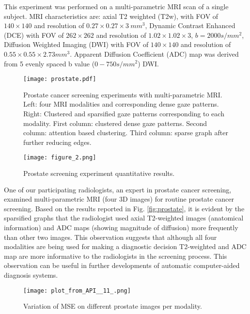 \documentclass[preprint,12pt]{elsarticle}
\begin{document}
This experiment was performed on a multi-parametric MRI scan of a single subject. MRI characteristics are: axial T2 weighted (T2w), with FOV of $140\times 140$ and resolution of $0.27\times 0.27\times 3~mm^{3}$, Dynamic Contrast Enhanced (DCE) with FOV of $262\times 262$ and resolution of $1.02\times 1.02\times 3$, $b=2000s/mm^{2}$, Diffusion Weighted Imaging (DWI) with FOV of $140\times 140$ and resolution of $0.55\times 0.55\times 2.73 mm^{3}$. Apparent Diffusion Coefficient (ADC) map was derived from 5 evenly spaced b value ($0-750s/mm^{2}$) DWI.


\begin{figure*}
\centering
\texttt{[image: prostate.pdf]}
\caption{Prostate cancer screening experiments with multi-parametric MRI. Left: four MRI modalities and corresponding dense gaze patterns. Right: Clustered and sparsified gaze patterns corresponding to each modality. First column: clustered dense gaze patterns. Second column: attention based clustering. Third column: sparse graph after further reducing edges. \label{fig:prostate}}
\texttt{[image: figure\_2.png]}
\caption{Prostate screening experiment quantitative results.\label{fig:prostatequantitative}}
\end{figure*}


One of our participating radiologists, an expert in prostate cancer screening, examined multi-parametric MRI (four 3D images) for routine prostate cancer screening. Based on the results reported in Fig. \ref{fig:prostate}, it is evident by the sparsified graphs that the radiologist used axial T2-weighted images (anatomical information) and ADC maps (showing magnitude of diffusion) more frequently than other two images. This observation suggests that although all four modalities are being used for making a diagnostic decision T2-weighted and ADC map are more informative to the radiologists in the screening process. This observation can be useful in further developments of automatic computer-aided diagnosis systems.






\begin{figure}[h]
\centering
\texttt{[image: plot\_from\_API\_\_11\_.png]}
\caption{Variation of MSE on different prostate images per modality.  \label{fig:prostatevariation}}
\end{figure}
\end{document}
